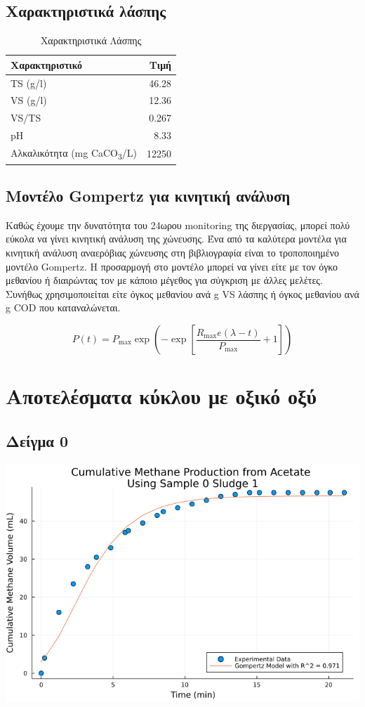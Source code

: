 \documentclass[11pt]{article}
\begin{document}
\subsection{Χαρακτηριστικά λάσπης}
\label{sec:org2df228c}
\begin{table}[htbp]
\caption{Χαρακτηριστικά Λάσπης}
\centering
\begin{tabular}{lr}
Χαρακτηριστικό & Τιμή\\[0pt]
\hline
TS (g/l) & 46.28\\[0pt]
VS (g/l) & 12.36\\[0pt]
VS/TS & 0.267\\[0pt]
pH & 8.33\\[0pt]
Αλκαλικότητα (mg CaCO\textsubscript{3}/L) & 12250\\[0pt]
\end{tabular}
\end{table}

\subsection{Μοντέλο Gompertz για κινητική ανάλυση}
\label{sec:orgb03bd5f}
Καθώς έχουμε την δυνατότητα του 24ωρου monitoring της διεργασίας, μπορεί πολύ εύκολα να γίνει κινητική ανάλυση της χώνευσης. Ένα από τα καλύτερα μοντέλα για κινητική ανάλυση αναερόβιας χώνευσης στη βιβλιογραφία είναι το τροποποιημένο μοντέλο Gompertz. Η προσαρμογή στο μοντέλο μπορεί να γίνει είτε με τον όγκο μεθανίου ή διαιρώντας τον με κάποιο μέγεθος για σύγκριση με άλλες μελέτες. Συνήθως χρησιμοποιείται είτε όγκος μεθανίου ανά g VS λάσπης ή όγκος μεθανίου ανά g COD που καταναλώνεται.

\[ P(t) = P_{\max } \exp \left( - \exp \left[ \frac{R_{\max }e (λ-t)}{P_{\max }} + 1 \right] \right) \]

\section{Αποτελέσματα κύκλου με οξικό οξύ}
\label{sec:orgff8f618}
\subsection{Δείγμα 0}
\label{sec:orge84e586}
\begin{center}
\includegraphics[width=.9\linewidth]{../plots/BMPs/Acetate/methane_kinetics_acet_test_0_s1_min.png}
\end{center}
\end{document}
